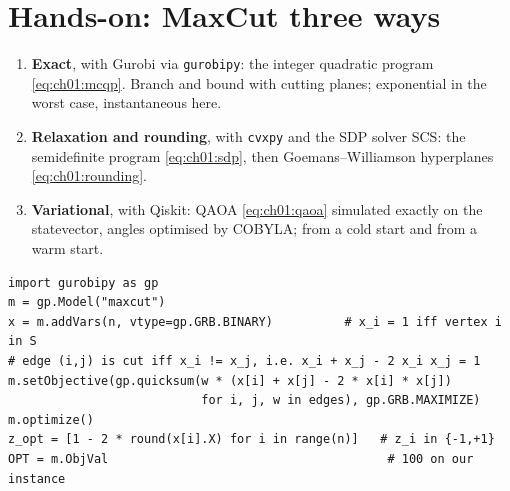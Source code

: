 \documentclass[overheadsbeamer.tex]{subfiles}
\begin{document}
\section{Hands-on: MaxCut three ways}\label{sec:ch01:code}

\begin{frame}
\begin{enumerate}\setlength\itemsep{0.3em}
    \item \textbf{Exact}, with Gurobi via \texttt{gurobipy}: the integer quadratic program \eqref{eq:ch01:mcqp}. Branch and bound with cutting planes; exponential in the worst case, instantaneous here.
    \item \textbf{Relaxation and rounding}, with \texttt{cvxpy} and the SDP solver SCS: the semidefinite program \eqref{eq:ch01:sdp}, then Goemans--Williamson hyperplanes \eqref{eq:ch01:rounding}.
    \item \textbf{Variational}, with Qiskit: QAOA \eqref{eq:ch01:qaoa} simulated exactly on the statevector, angles optimised by COBYLA; from a cold start and from a warm start.
\end{enumerate}
\end{frame}

\begin{frame}[fragile]
\begin{lstlisting}
import gurobipy as gp
m = gp.Model("maxcut")
x = m.addVars(n, vtype=gp.GRB.BINARY)          # x_i = 1 iff vertex i in S
# edge (i,j) is cut iff x_i != x_j, i.e. x_i + x_j - 2 x_i x_j = 1
m.setObjective(gp.quicksum(w * (x[i] + x[j] - 2 * x[i] * x[j])
                           for i, j, w in edges), gp.GRB.MAXIMIZE)
m.optimize()
z_opt = [1 - 2 * round(x[i].X) for i in range(n)]   # z_i in {-1,+1}
OPT = m.ObjVal                                       # 100 on our instance
\end{lstlisting}
\end{frame}
\end{document}

